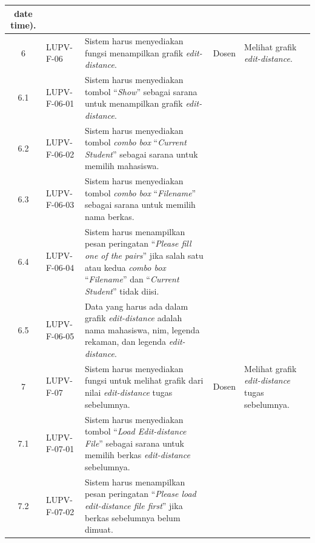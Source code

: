 {\begin{longtable}{|c|L{2.5cm}|L{5cm}|L{1.8cm}|L{2.1cm}|}
{                         date time}).  & & \\\hline
    6 & LUPV-F-06 & Sistem harus menyediakan fungsi menampilkan grafik
                    \emph{edit-distance}. & Dosen & Melihat grafik
                                                    \emph{edit-distance}.\\
    6.1 & LUPV-F-06-01 & Sistem harus menyediakan tombol
                         ``\emph{Show}'' sebagai sarana untuk
                         menampilkan grafik \emph{edit-distance}. & & \\
    6.2 & LUPV-F-06-02 & Sistem harus menyediakan tombol
                         \emph{combo box} ``\emph{Current Student}'' sebagai sarana untuk
                         memilih mahasiswa.  & & \\
    6.3 & LUPV-F-06-03 & Sistem harus menyediakan tombol
                         \emph{combo box} ``\emph{Filename}'' sebagai sarana untuk
                         memilih nama berkas.  & & \\
    6.4 & LUPV-F-06-04 & Sistem harus menampilkan pesan peringatan ``\emph{Please fill
                         one of the pairs}'' jika
                         salah satu atau kedua \emph{combo box}
                         ``\emph{Filename}'' dan ``\emph{Current Student}'' tidak
                         diisi. & & \\
    6.5 & LUPV-F-06-05 & Data yang harus ada dalam grafik
                         \emph{edit-distance} adalah nama mahasiswa,
                         nim, legenda rekaman, dan legenda \emph{edit-distance}. & & \\\hline
    7 & LUPV-F-07 & Sistem harus menyediakan fungsi untuk melihat
                    grafik dari nilai \emph{edit-distance} tugas
                    sebelumnya. & Dosen & Melihat grafik
                                          \emph{edit-distance} tugas
                                          sebelumnya. \\
    7.1 & LUPV-F-07-01 & Sistem harus menyediakan tombol ``\emph{Load
                         Edit-distance File}'' sebagai sarana untuk memilih
                         berkas \emph{edit-distance} sebelumnya. & & \\
    7.2 & LUPV-F-07-02 & Sistem harus menampilkan pesan peringatan ``\emph{Please load
                         edit-distance file first}'' jika
                         berkas sebelumnya belum dimuat. & & \\

\end{longtable}}
